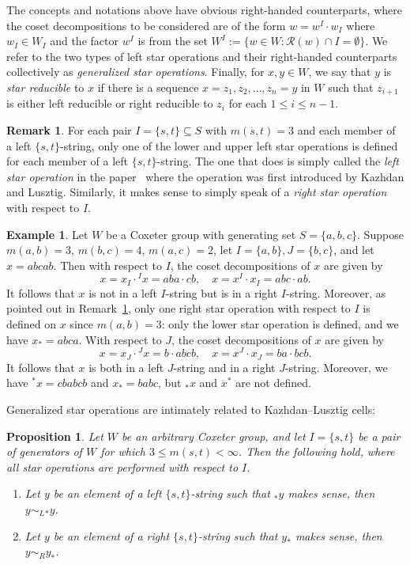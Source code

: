 \documentclass[10pt]{article}
\newtheorem{prop}[theorem]{Proposition}
\theoremstyle{definition}
\newtheorem{rema}[theorem]{Remark}
\newtheorem{exam}[theorem]{Example}
\newcommand{\se}{\subseteq}
\begin{document}
 The concepts and notations above have obvious right-handed counterparts,
 where the coset decompositions to be considered are of the form
 $w=w^I\cdot w_I$ where $w_I\in W_I$ and the factor $w^I$ is from the set $W^I:=\{w\in
 W:\mathcal{R}(w)\cap I=\emptyset\}$. We
 refer to the two types of left star operations and their right-handed
 counterparts collectively as
 \emph{generalized star operations}. Finally, for $x,y\in W$, we say that $y$
 is \emph{star reducible} to $x$ if there is a sequence
 $x=z_1,z_2,\ldots,z_n=y$ in $W$ such that $z_{i+1}$ is either left reducible
 or right reducible to $z_i$ for each $1\le i\le n-1$.

 \begin{rema}
 \label{original star}
 For each pair $I=\{s,t\}\se S$ with $m(s,t)=3$ and each member of a left $\{s,t\}$-string, only one of the lower and upper left star
 operations is defined for
 each member of a left $\{s,t\}$-string. The one that does is simply called
 the \emph{left star operation} in the paper~\cite{KL} where the operation
 was first introduced by Kazhdan and Lusztig. Similarly, it makes sense to
 simply speak of a \emph{right star operation} with respect to $I$. 
 \end{rema}


 \begin{exam}
 \label{star example}
 Let $W$ be a Coxeter group with generating set $S=\{a,b,c\}$. Suppose
 $m(a,b)=3$, $m(b,c)=4$, $m(a,c)=2$, let $I=\{a,b\}, J=\{b,c\}$, and let $x=abcab$. Then with respect to $I$, the coset decompositions of
 $x$ are given by
 \[x= x_I\cdot {}^I x= aba\cdot cb, \quad x= x^I \cdot x_I = abc\cdot ab.\]
 It follows that $x$ is not in a left $I$-string but is in a right $I$-string.
 Moreover, as pointed out in Remark~\ref{original star}, only one right star operation with respect
 to $I$ is defined on $x$ since $m(a,b)=3$: only the lower star
 operation is defined, and we have $x_*=abca$. With respect to
 $J$, the coset decompositions of $x$ are given by 
 \[
 x=x_J\cdot {}^J x=b\cdot abcb, \quad x=x^J\cdot x_J=ba\cdot bcb.\]
 It follows that $x$ is both in a left $J$-string and in a right $J$-string.
 Moreover, we have ${}^{*}x=cbabcb$ and $x_*=babc$, but ${}_*x$ and
 $x^*$ are not defined.
 \end{exam}


 Generalized star operations are intimately related to Kazhdan--Lusztig
 cells:

 \begin{prop} 
 \label{star and cell} 
 Let $W$ be an arbitrary Coxeter group, and let $I=\{s,t\}$ be a pair of
 generators of $W$ for which $3\le m(s,t)<\infty$. Then the following hold,
 where all star operations are performed with respect to $I$.
 \begin{enumerate} 
 \item\label{prop3.3_1} Let $y$ be an element of a left $\{s,t\}$-string such that 
 ${}_*y$ makes sense, then $y\sim_{L}
 {}_* y$. 
 \item\label{prop3.3_2} Let $y$ be an element of a right $\{s,t\}$-string such that 
 $y_*$ makes sense, then $y\sim_{R} y_*$. 
 \end{enumerate} 
 \end{prop}
\end{document}
